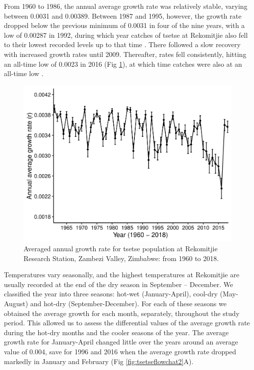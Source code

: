 \documentclass[12pt,a4paper]{article}
\begin{document}
From 1960 to 1986, the annual average growth rate was relatively stable, varying between 0.0031 and 0.00389.  Between 1987 and 1995, however, the growth rate dropped below the previous minimum of 0.0031 in four of the nine years, with a low of 0.00287 in 1992, during which year catches of tsetse at Rekomitjie also fell to their lowest recorded levels up to that time \cite{hargrove2015mortality}. There followed a slow recovery with increased growth rates until 2009. Thereafter, rates fell consistently, hitting an all-time low of 0.0023 in 2016 (Fig \ref{fig:tsetseflowchat0}), at which time catches were also at an all-time low \cite{Lord2018}.


\begin{figure}[hbt!]
	\centering
	\includegraphics[width=0.8\linewidth]{GratewithErrBars}
	\caption{Averaged annual growth rate for tsetse population at Rekomitjie Research Station, Zambezi Valley, Zimbabwe: from 1960 to 2018.}
	\label{fig:tsetseflowchat0}
\end{figure} 
Temperatures vary seasonally, and the highest temperatures at Rekomitjie are usually recorded at the end of the dry season in September – December. We classified the year into three seasons: hot-wet (January-April), cool-dry (May-August) and hot-dry (September-December). For each of these seasons we obtained the average growth for each month, separately, throughout the study period. This allowed us to assess the differential values of the average growth rate during the hot-dry months and the cooler seasons of the year. The average growth rate for January-April changed little over the years around an average value of 0.004, save for 1996 and 2016 when the average growth rate dropped markedly in January and February (Fig \ref{fig:tsetseflowchat2}A).  
\end{document}
